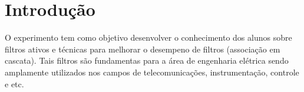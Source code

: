 \newpage

\section{Introdução}
O experimento tem como objetivo desenvolver o conhecimento dos alunos sobre filtros ativos e técnicas para melhorar o desempeno de filtros (associação em cascata). Tais filtros são fundamentas para a área de engenharia elétrica sendo amplamente utilizados nos campos de telecomunicações, instrumentação, controle e etc.